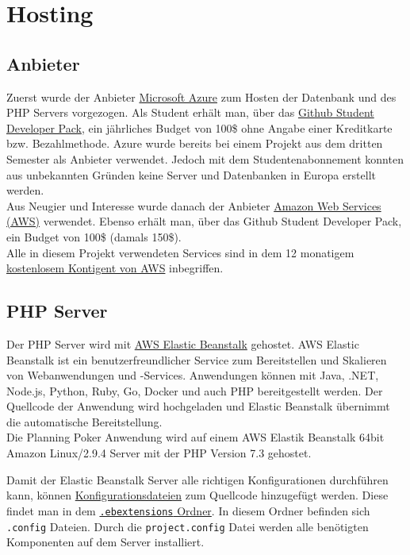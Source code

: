 \chapter{Hosting}\label{ch:hosting}

\section{Anbieter}
Zuerst wurde der Anbieter \href{https://azure.microsoft.com/de-de/}{Microsoft Azure} zum Hosten der Datenbank und des PHP Servers vorgezogen. Als Student erhält man, über das \href{https://education.github.com/pack}{Github Student Developer Pack}, ein jährliches Budget von 100\$ ohne Angabe einer Kreditkarte bzw. Bezahlmethode. Azure wurde bereits bei einem Projekt aus dem dritten Semester als Anbieter verwendet. Jedoch mit dem Studentenabonnement konnten aus unbekannten Gründen keine Server und Datenbanken in Europa erstellt werden.\\
Aus Neugier und Interesse wurde danach der Anbieter \href{https://aws.amazon.com/de/}{Amazon Web Services (AWS)} verwendet. Ebenso erhält man, über das Github Student Developer Pack, ein Budget von 100\$ (damals 150\$).\\
Alle in diesem Projekt verwendeten Services sind in dem 12 monatigem \href{https://aws.amazon.com/de/free/}{kostenlosem Kontigent von AWS} inbegriffen.

\section{PHP Server}
Der PHP Server wird mit \href{https://aws.amazon.com/de/elasticbeanstalk/}{AWS Elastic Beanstalk} gehostet. \glqq AWS Elastic Beanstalk ist ein benutzerfreundlicher Service zum Bereitstellen und Skalieren von Webanwendungen und -Services\grqq. Anwendungen können mit Java, .NET, Node.js, Python, Ruby, Go, Docker und auch PHP bereitgestellt werden. Der Quellcode der Anwendung wird hochgeladen und Elastic Beanstalk übernimmt die automatische Bereitstellung. \cite{AWSEB}\\
Die Planning Poker Anwendung wird auf einem AWS Elastik Beanstalk 64bit Amazon Linux/2.9.4 Server mit der PHP Version 7.3 gehostet.

Damit der Elastic Beanstalk Server alle richtigen Konfigurationen durchführen kann, können \href{https://docs.aws.amazon.com/de_de/elasticbeanstalk/latest/dg/ebextensions.html}{Konfigurationsdateien} zum Quellcode hinzugefügt werden. Diese findet man in dem \href{https://github.com/Drinkler/Planning-Poker/tree/master/.ebextensions}{\lstinline{.ebextensions} Ordner}. In diesem Ordner befinden sich \lstinline{.config} Dateien. Durch die \lstinline{project.config} Datei werden alle benötigten Komponenten auf dem Server installiert.
